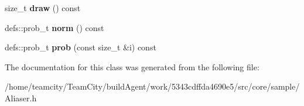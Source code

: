 \begin{DoxyCompactItemize}
\item 
size\+\_\+t {\bfseries draw} () const \hypertarget{classAliaser_a767b8402017e59b6a8e242a07006adda}{}\label{classAliaser_a767b8402017e59b6a8e242a07006adda}

\item 
defs\+::prob\+\_\+t {\bfseries norm} () const \hypertarget{classAliaser_a07412197898076fcbf7e5a9679722f33}{}\label{classAliaser_a07412197898076fcbf7e5a9679722f33}

\item 
defs\+::prob\+\_\+t {\bfseries prob} (const size\+\_\+t \&i) const \hypertarget{classAliaser_ade32f8b7ca75b5ad28c5133c6b4b64a8}{}\label{classAliaser_ade32f8b7ca75b5ad28c5133c6b4b64a8}

\end{DoxyCompactItemize}


The documentation for this class was generated from the following file\+:\begin{DoxyCompactItemize}
\item 
/home/teamcity/\+Team\+City/build\+Agent/work/5343cdffda4690e5/src/core/sample/Aliaser.\+h\end{DoxyCompactItemize}
